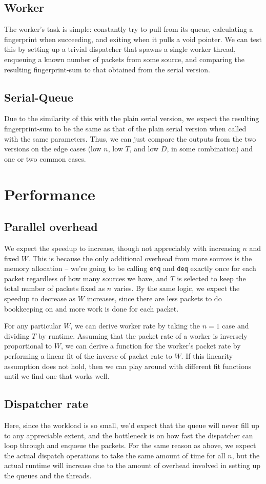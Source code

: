 \documentclass{article}
\begin{document}
\subsection*{Worker}
The worker's task is simple: constantly try to pull from its queue, calculating a fingerprint when succeeding, and exiting when it pulls a void pointer. We can test this by setting up a trivial dispatcher that spawns a single worker thread, enqueuing a known number of packets from some source, and comparing the resulting fingerprint-sum to that obtained from the serial version. 

\subsection*{Serial-Queue}
Due to the similarity of this with the plain serial version, we expect the resulting fingerprint-sum to be the same as that of the plain serial version when called with the same parameters. Thus, we can just compare the outputs from the two versions on the edge cases (low $n$, low $T$, and low $D$, in some combination) and one or two common cases.

\section*{Performance}
\subsection*{Parallel overhead}
We expect the speedup to increase, though not appreciably with increasing $n$ and fixed $W$. This is because the only additional overhead from more sources is the memory allocation -- we're going to be calling \verb|enq| and \verb|deq| exactly once for each packet regardless of how many sources we have, and $T$ is selected to keep the total number of packets fixed as $n$ varies. By the same logic, we expect the speedup to decrease as $W$ increases, since there are less packets to do bookkeeping on and more work is done for each packet.

For any particular $W$, we can derive worker rate by taking the $n=1$ case and dividing $T$ by runtime. Assuming that the packet rate of a worker is inversely proportional to $W$, we can derive a function for the worker's packet rate by performing a linear fit of the inverse of packet rate to $W$. If this linearity assumption does not hold, then we can play around with different fit functions until we find one that works well.
\subsection*{Dispatcher rate}
Here, since the workload is so small, we'd expect that the queue will never fill up to any appreciable extent, and the bottleneck is on how fast the dispatcher can loop through and enqueue the packets. For the same reason as above, we expect the actual dispatch operations to take the same amount of time for all $n$, but the actual runtime will increase due to the amount of overhead involved in setting up the queues and the threads.
\end{document}
